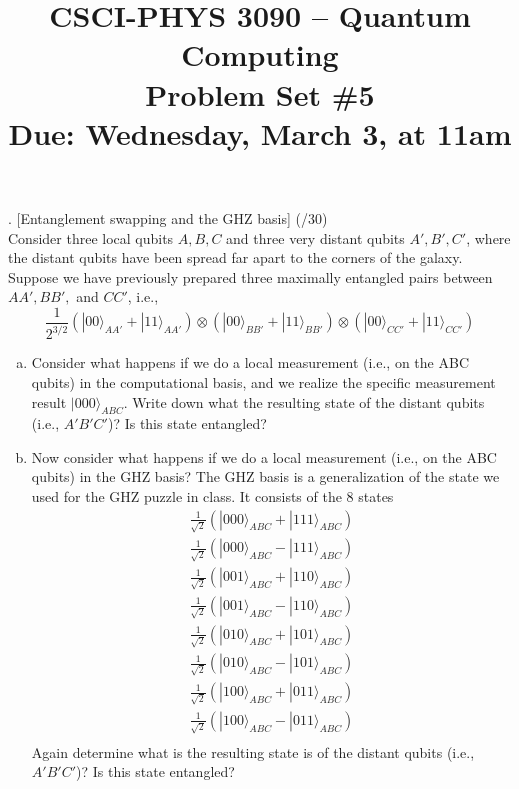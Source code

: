 \documentclass[11pt]{article}
\begin{document}
\date{}
\title{CSCI-PHYS 3090 -- Quantum Computing\\ Problem Set \#5 \\  Due: Wednesday, March 3, at 11am}
\maketitle

 
. [Entanglement swapping and the GHZ basis] (/30)
\\
Consider three local qubits $A, B, C$ and three very distant qubits $A', B', C'$, where the distant qubits have been spread far apart to the corners of the galaxy. Suppose we have previously prepared three maximally entangled pairs between $AA',BB',$ and $CC'$, i.e.,
$$\frac{1}{2^{3/2}}(|00\rangle_{AA'}+|11\rangle_{AA'})\otimes(|00\rangle_{BB'}+|11\rangle_{BB'})\otimes(|00\rangle_{CC'}+|11\rangle_{CC'})$$

\begin{enumerate}[(a)]
    \item Consider what happens if we do a local measurement (i.e., on the ABC qubits) in the computational basis, and we realize the specific measurement result $|000\rangle_{ABC}$. Write down what the resulting state of the distant qubits (i.e., $A'B'C'$)? Is this state
entangled?
    \item Now consider what happens if we do a local measurement (i.e., on the ABC qubits) in the GHZ basis? The GHZ basis is a generalization of the state we used for the GHZ puzzle in class. It consists of the 8 states 
    $$ \begin{array}{c}
        \frac{1}{\sqrt{2}}(|000\rangle_{ABC} + |111\rangle_{ABC})  \\
        \frac{1}{\sqrt{2}}(|000\rangle_{ABC} - |111\rangle_{ABC})  \\
        \frac{1}{\sqrt{2}}(|001\rangle_{ABC} + |110\rangle_{ABC})  \\
        \frac{1}{\sqrt{2}}(|001\rangle_{ABC} - |110\rangle_{ABC})  \\
        \frac{1}{\sqrt{2}}(|010\rangle_{ABC} + |101\rangle_{ABC})  \\
        \frac{1}{\sqrt{2}}(|010\rangle_{ABC} - |101\rangle_{ABC})  \\
        \frac{1}{\sqrt{2}}(|100\rangle_{ABC} + |011\rangle_{ABC})  \\
        \frac{1}{\sqrt{2}}(|100\rangle_{ABC} - |011\rangle_{ABC})  \\
    \end{array} $$
    Again determine what is the resulting state is of the distant qubits (i.e., $A'B'C'$)? Is this state entangled?
\end{enumerate}
\end{document}
